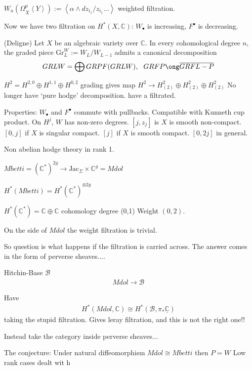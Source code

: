 \begin{definition}
    $W_n ( \Omega_\bar{X} ^p \left<Y \right> ) := \left< \alpha \wedge dz_{i_1} / z_{i_1} ... \right> $ 
    weighted filtration. 
\end{definition}

Now we have two filtration on $H^* ( X, \mathbb{C} ) $: $ W_\bullet $ is increasing, $ F^\bullet $ is decreasing. 

\begin{theorem}
    (Deligne)  Let $ X $ be an algebraic variety over $ \mathbb{C} $. 
    In every cohomological degree $n$, 
    the graded piece $ \mathrm{Gr}_L ^W := W_L / W_{L-1 } $ 
    admits a canonical decomposition 
    \begin{align}
        GRLW = \bigoplus GRPF (GRLW) , ~~ GRFP \ong \overline{GRFL-P}
    \end{align}
\end{theorem}

$H^2 = H^{2,0} \oplus H^{1,1} \oplus H^{0,2} $ 
grading gives map $ H^2 \rightarrow   H^2 _{(2) } \oplus  H^2 _{(2) }\oplus   H^2 _{(2) } $ 
No longer have `pure hodge' decomposition. 
have a filtrated. 

Properties:
$ W_\bullet $ and $ F^\bullet $ commute with pullbacks. 
Compatible with Kunneth cup product. 
On $H^j $, $ W $ has non-zero degrees. 
$[j, z_j ] $ is $ X $ is smooth non-compact. 
$[ 0, j ] $ if $ X $ is singular compact.
$[ j ] $ if $ X $ is  smooth compact. 
$[ 0, 2j ] $ in general. 

Non abelian hodge theory in rank 1. 

$ Mbetti = ( \mathbb{C} ^* ) ^{2g} \rightarrow  \mathrm{Jac} _\Sigma \times \mathbb{C}  ^g = Mdol $ 

$H^* ( Mbetti) = H^* ( \mathbb{C} ^* ) ^{\otimes 2g} $ 

$ H^*( \mathbb{C} ^* ) = \mathbb{C} \oplus \mathbb{C}  $ 
cohomology degree (0,1) 
Weight $( 0, 2) $. 

On the side of $Mdol$ the weight filtration is trivial. 

So question is what happens if the filtration is carried across. 
The answer comes in the form of perverse sheaves.... 

Hitchin-Base  $\mathcal{B} $ 
\begin{align}
    Mdol \rightarrow  \mathcal{B} 
\end{align}

Have 
\begin{align}
     H^* ( Mdol , \mathbb{C} ) \cong H^* ( \mathcal{B} , \pi_* \underline{\mathbb{C} } ) 
\end{align}
taking the stupid filtration. 
Gives leray filtration, and this is not the right one!! 

Instead take the category inside perverse sheaves... 

The conjecture: 
Under natural diffeomorphism 
$Mdol \cong Mbetti $ then $ P= W $ 
Low rank cases dealt wit h 








 

